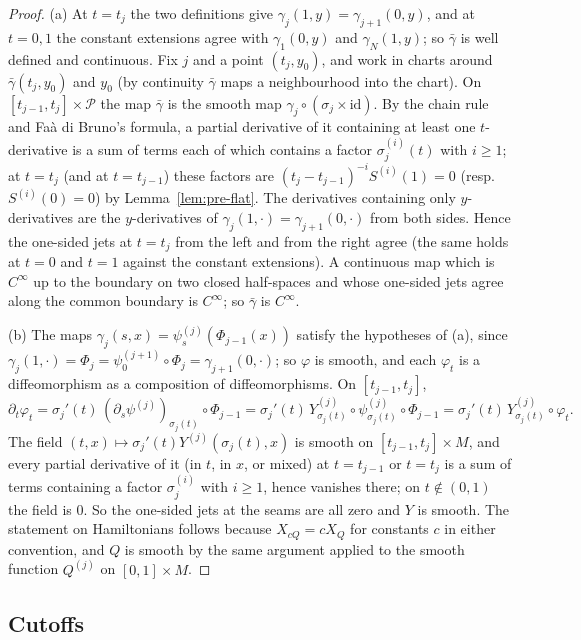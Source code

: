 \begin{proof}
(a) At $t=t_j$ the two definitions give $\gamma_j(1,y)=\gamma_{j+1}(0,y)$, and at $t=0,1$ the constant extensions agree
with $\gamma_1(0,y)$ and $\gamma_N(1,y)$; so $\bar\gamma$ is well defined and continuous. Fix $j$ and a point $(t_j,y_0)$, and
work in charts around $\bar\gamma(t_j,y_0)$ and $y_0$ (by continuity $\bar\gamma$ maps a neighbourhood into the chart). On
$[t_{j-1},t_j]\times\mathcal P$ the map $\bar\gamma$ is the smooth map $\gamma_j\circ(\sigma_j\times\mathrm{id})$. By the chain rule and
Fa\`a di Bruno's formula, a partial derivative of it containing at least one $t$-derivative is a sum of terms each of
which contains a factor $\sigma_j^{(i)}(t)$ with $i\ge1$; at $t=t_j$ (and at $t=t_{j-1}$) these factors are
$(t_j-t_{j-1})^{-i}S^{(i)}(1)=0$ (resp.\ $S^{(i)}(0)=0$) by Lemma~\ref{lem:pre-flat}. The derivatives containing only
$y$-derivatives are the $y$-derivatives of $\gamma_j(1,\cdot)=\gamma_{j+1}(0,\cdot)$ from both sides. Hence the one-sided
jets at $t=t_j$ from the left and from the right agree (the same holds at $t=0$ and $t=1$ against the constant
extensions). A continuous map which is $C^\infty$ up to the boundary on two closed half-spaces and whose
one-sided jets agree along the common boundary is $C^\infty$; so $\bar\gamma$ is $C^\infty$.

(b) The maps $\gamma_j(s,x)=\psi^{(j)}_s(\Phi_{j-1}(x))$ satisfy the hypotheses of (a), since
$\gamma_j(1,\cdot)=\Phi_j=\psi^{(j+1)}_0\circ\Phi_j=\gamma_{j+1}(0,\cdot)$; so $\varphi$ is smooth, and each $\varphi_t$ is a
diffeomorphism as a composition of diffeomorphisms. On $[t_{j-1},t_j]$,
\[
 \partial_t\varphi_t=\sigma_j'(t)\,(\partial_s\psi^{(j)})_{\sigma_j(t)}\circ\Phi_{j-1}
 =\sigma_j'(t)\,Y^{(j)}_{\sigma_j(t)}\circ\psi^{(j)}_{\sigma_j(t)}\circ\Phi_{j-1}=\sigma_j'(t)\,Y^{(j)}_{\sigma_j(t)}\circ\varphi_t .
\]
The field $(t,x)\mapsto\sigma_j'(t)Y^{(j)}(\sigma_j(t),x)$ is smooth on $[t_{j-1},t_j]\times M$, and every partial derivative of
it (in $t$, in $x$, or mixed) at $t=t_{j-1}$ or $t=t_j$ is a sum of terms containing a factor $\sigma_j^{(i)}$ with $i\ge1$,
hence vanishes there; on $t\notin(0,1)$ the field is $0$. So the one-sided jets at the seams are all zero and
$Y$ is smooth. The statement on Hamiltonians follows because $X_{cQ}=cX_Q$ for constants $c$ in either
convention, and $Q$ is smooth by the same argument applied to the smooth function $Q^{(j)}$ on $[0,1]\times M$.
\end{proof}

\subsection{Cutoffs}\label{sec:pre-cutoff}

